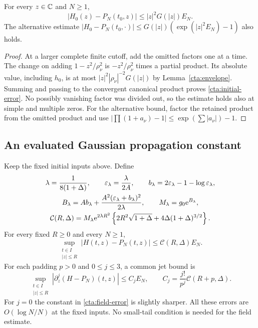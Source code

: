 \begin{lemma}
\label{cta:telescoping}
For every $z\in\mathbb C$ and $N\ge1$,
\begin{equation}
 |H_0(z)-P_N(t_0,z)|\le |z|^2G(|z|)E_N.
 \label{cta:initial-error}
\end{equation}
The alternative estimate
$|H_0-P_N(t_0,\cdot)|\le G(|z|)(\exp(|z|^2E_N)-1)$ also holds.
\end{lemma}

\begin{proof}
At a larger complete finite cutoff, add the omitted factors one at a
time. The change on adding $1-z^2/\rho_\nu^2$ is $-z^2/\rho_\nu^2$
times a partial product. Its absolute value, including $h_0$, is at
most $|z|^2|\rho_\nu|^{-2}G(|z|)$ by
Lemma~\ref{cta:envelope}. Summing and passing to the convergent
canonical product proves \eqref{cta:initial-error}. No possibly
vanishing factor was divided out, so the estimate holds also at simple
and multiple zeros. For the alternative bound, factor the retained
product from the omitted product and use
$|\prod(1+a_\nu)-1|\le\exp(\sum|a_\nu|)-1$.
\end{proof}

\subsection{An evaluated Gaussian propagation constant}

\begin{theorem}
\label{cta:field-theorem}
Keep the fixed initial inputs above. Define
\begin{equation}
 \begin{gathered}
 \lambda=\frac1{8(1+\Delta)},\qquad
 \varepsilon_\lambda=\frac{\lambda}{2A},\qquad
 b_\lambda=2\varepsilon_\lambda-1-\log\varepsilon_\lambda,\\
 B_\lambda=A b_\lambda+
       \frac{A^2(\varepsilon_\lambda+b_\lambda)^2}{2\lambda},
 \qquad M_\lambda=g_0\mathrm e^{B_\lambda},\\
 \mathcal C(R,\Delta)=M_\lambda\mathrm e^{2\lambda R^2}
       \left\{2R^2\sqrt{1+\Delta}
                     +4\Delta(1+\Delta)^{3/2}\right\}.
 \end{gathered}
 \label{cta:gaussian-constant}
\end{equation}
For every fixed $R\ge0$ and every $N\ge1$,
\begin{equation}
 \sup_{\substack{t\in I\\|z|\le R}}
       |H(t,z)-P_N(t,z)|\le\mathcal C(R,\Delta)E_N.
 \label{cta:field-error}
\end{equation}
For each padding $p>0$ and $0\le j\le3$, a common jet bound is
\begin{equation}
 \sup_{\substack{t\in I\\|z|\le R}}
       |\partial_z^j(H-P_N)(t,z)|\le C_jE_N,
 \qquad C_j=\frac{j!}{p^j}\mathcal C(R+p,\Delta).
 \label{cta:jet-error}
\end{equation}
For $j=0$ the constant in \eqref{cta:field-error} is slightly sharper.
All these errors are $O(\log N/N)$ at the fixed inputs. No small-tail
condition is needed for the field estimate.
\end{theorem}


